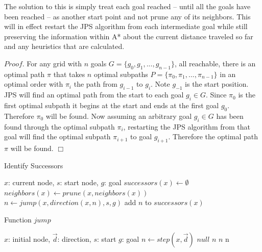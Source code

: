\documentclass[12pt]{article}
\begin{document}
The solution to this is simply treat each goal reached -- until all the goals have been reached -- as another start point and not
prune any of its neighbors. This will in effect restart the JPS algorithm from each intermediate goal while still preserving the information within A*
about the current distance traveled so far and any heuristics that are calculated.

$Proof.$
For any grid with $n$ goals $G = \{ g_{0}, g_{1}, ..., g_{n-1} \} $, all reachable, there is an optimal path $\pi$ that takes $n$ optimal subpaths 
$P = \{ \pi_{0}, \pi_{1}, ..., \pi_{n-1} \}$ in an optimal order with $\pi_{i}$ the path from $g_{i-1}$ to $g_{i}$. Note $g_{-1}$ is the start position.
JPS will find an optimal path from the start to each goal $g_{i} \in G$. 
Since $\pi_{0}$ is the first optimal subpath it begins at the start and ends at the first goal $g_{0}$. Therefore $\pi_{0}$ will be found. 
Now assuming an arbitrary goal $g_{i} \in G$ has been found through the optimal subpath $\pi_{i}$, restarting the JPS algorithm from that goal will find 
the optimal subpath $\pi_{i+1}$ to goal $g_{i+1}$. Therefore the optimal path $\pi$ will be found. $\Box$

\begin{algorithm}
\caption{Identify Successors}\label{IdSuccessors}
\begin{algorithmic}[1]
\Require $x$: current node, $s$: start node, $g$: goal
\State $successors(x) \gets \emptyset$
\State $neighbors(x) \gets prune(x,neighbors(x))$
  \State $n \gets jump(x,direction(x,n),s,g)$
  \State add $n$ to $successors(x)$
\EndFor
\end{algorithmic}
\end{algorithm}

\begin{algorithm}
\caption{Function $jump$}\label{jump}
\begin{algorithmic}[1]
\Require $x$: initial node, $\vec{d}$: direction, $s$: start $g$: goal
\State $n \gets step(x,\vec{d})$
  \State \Return $null$
\EndIf
{}
  \State \Return $n$
\EndIf
{}
  \State \Return $n$
\EndIf
{}
      \State \Return n
    \EndIf
  \EndFor
\EndIf
\end{algorithmic}
\end{algorithm}
\end{document}
